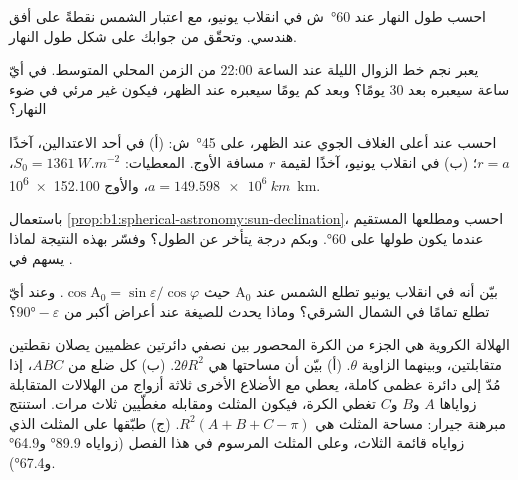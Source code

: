 \begin{exercise}[$\star\star$]\label{exo:b1:spherical-astronomy:7}
احسب طول النهار عند  \ang{60}~ش في انقلاب يونيو، مع اعتبار الشمس نقطةً على أفق هندسي. وتحقّق من جوابك على شكل طول النهار.
\end{exercise}

\begin{exercise}[$\star\star$]\label{exo:b1:spherical-astronomy:8}
يعبر نجم خط الزوال الليلة عند الساعة 22:00 من الزمن المحلي المتوسط. في أيّ ساعة سيعبره بعد 30 يومًا؟ وبعد كم يومًا سيعبره عند الظهر، فيكون غير مرئي في ضوء النهار؟
\end{exercise}

\begin{exercise}[$\star\star$]\label{exo:b1:spherical-astronomy:9}
احسب  عند أعلى الغلاف الجوي عند الظهر، على  \ang{45}~ش: (أ) في أحد الاعتدالين، آخذًا $r = a$؛ (ب) في انقلاب يونيو، آخذًا لقيمة $r$ مسافة الأوج. المعطيات: $S_0 = \qty{1361}{W.m^{-2}}$،
$a = \qty{149.598e6}{km}$، والأوج \qty{152.100e6}{km}.
\end{exercise}

\begin{exercise}[$\star\star\star$]\label{exo:b1:spherical-astronomy:10}
باستعمال \cref{prop:b1:spherical-astronomy:sun-declination}، احسب  ومطلعها المستقيم عندما يكون طولها على  \ang{60}. وبكم درجة يتأخر  عن الطول؟ وفسّر بهذه النتيجة لماذا يسهم  في .
\end{exercise}

\begin{exercise}[$\star\star\star$]\label{exo:b1:spherical-astronomy:11}
بيّن أنه في انقلاب يونيو تطلع الشمس عند  $\mathrm{A}_0$ حيث $\cos\mathrm{A}_0 = \sin\varepsilon/\cos\varphi$. وعند أيّ  تطلع تمامًا في الشمال الشرقي؟ وماذا يحدث للصيغة عند أعراض أكبر من $\ang{90} - \varepsilon$؟
\end{exercise}

\begin{exercise}[$\star\star\star$]\label{exo:b1:spherical-astronomy:12}
الهلالة الكروية هي الجزء من الكرة المحصور بين نصفي دائرتين عظميين يصلان نقطتين متقابلتين، وبينهما الزاوية $\theta$. (أ) بيّن أن مساحتها هي $2\theta R^2$. (ب) كل ضلع من  $ABC$، إذا مُدّ إلى دائرة عظمى كاملة، يعطي مع الأضلاع الأخرى ثلاثة أزواج من الهلالات المتقابلة زواياها $A$ و$B$ و$C$ تغطي الكرة، فيكون المثلث ومقابله مغطّيين ثلاث مرات. استنتج مبرهنة جيرار: مساحة المثلث هي $R^2(A + B + C - \pi)$. (ج) طبّقها على المثلث الذي زواياه قائمة الثلاث، وعلى المثلث المرسوم في هذا الفصل (زواياه \ang{89.9} و\ang{64.9} و\ang{67.4}).
\end{exercise}

